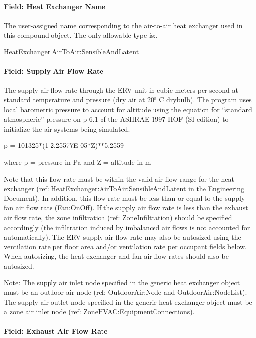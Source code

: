 \paragraph{Field: Heat Exchanger Name}\label{field-heat-exchanger-name-002}

The user-assigned name corresponding to the air-to-air heat exchanger used in this compound object. The only allowable type is:.

HeatExchanger:AirToAir:SensibleAndLatent

\paragraph{Field: Supply Air Flow Rate}\label{field-supply-air-flow-rate-000}

The supply air flow rate through the ERV unit in cubic meters per second at standard temperature and pressure (dry air at 20\(^{o}\) C drybulb). The program uses local barometric pressure to account for altitude using the equation for ``standard atmospheric'' pressure on p 6.1 of the ASHRAE 1997 HOF (SI edition) to initialize the air systems being simulated.

p = 101325*(1-2.25577E-05*Z)**5.2559

where p = pressure in Pa and Z = altitude in m

Note that this flow rate must be within the valid air flow range for the heat exchanger (ref: HeatExchanger:AirToAir:SensibleAndLatent in the Engineering Document). In addition, this flow rate must be less than or equal to the supply fan air flow rate (Fan:OnOff). If the supply air flow rate is less than the exhaust air flow rate, the zone infiltration (ref: ZoneInfiltration) should be specified accordingly (the infiltration induced by imbalanced air flows is not accounted for automatically). The ERV supply air flow rate may also be autosized using the ventilation rate per floor area and/or ventilation rate per occupant fields below. When autosizing, the heat exchanger and fan air flow rates should also be autosized.

Note: The supply air inlet node specified in the generic heat exchanger object must be an outdoor air node (ref: OutdoorAir:Node and OutdoorAir:NodeList). The supply air outlet node specified in the generic heat exchanger object must be a zone air inlet node (ref: ZoneHVAC:EquipmentConnections).

\paragraph{Field: Exhaust Air Flow Rate}\label{field-exhaust-air-flow-rate-1}

